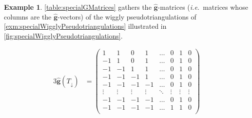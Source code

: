 \documentclass{amsart}
\theoremstyle{definition}
\newtheorem{example}[theorem]{Example}
\renewcommand{\b}[1]{{\boldsymbol{#1}}} %
\newcommand{\ie}{\textit{i.e.}~} %
\begin{document}
\begin{example}
\label{exm:specialGMatrices}
\cref{table:specialGMatrices} gathers the $\hat{\b{g}}$-matrices (\ie matrices whose columns are the $\hat{\b{g}}$-vectors) of the wiggly pseudotriangulations of \cref{exm:specialWigglyPseudotriangulations} illustrated in \cref{fig:specialWigglyPseudotriangulations}.

\begin{table}[p]
	\begingroup
	\fontsize{10}{10}\selectfont
	\setlength\arraycolsep{2pt}
	\begin{alignat*}{3}
	\hat{\b{g}}(T_\downarrow) & = \begin{pmatrix}
		1 & 1 & 0 & 1 & \dots & 0 & 1 & 0 \\
		-1 & 1 & 0 & 1 & \dots & 0 & 1 & 0 \\
		-1 & -1 & 1 & 1 & \dots & 0 & 1 & 0 \\
		-1 & -1 & -1 & 1 & \dots & 0 & 1 & 0 \\
		-1 & -1 & -1 & -1 & \dots & 0 & 1 & 0 \\
		\vdots & \vdots & \vdots & \vdots & \ddots & \vdots & \vdots & \vdots \\
		-1 & -1 & -1 & -1 & \dots & 0 & 1 & 0 \\
		-1 & -1 & -1 & -1 & \dots & 1 & 1 & 0 \\

\end{pmatrix}
\end{alignat*}
\end{table}
\end{example}
\end{document}
